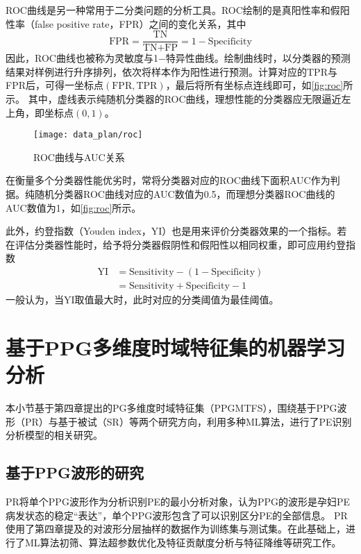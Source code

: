 ROC曲线是另一种常用于二分类问题的分析工具。ROC绘制的是真阳性率和假阳性率（false positive rate，FPR）之间的变化关系，其中
\begin{equation}
      \label{equ:fpr}
      \text{FPR}=\frac{\text{TN}}{\text{TN+FP}}=1-\text{Specificity}
\end{equation}
因此，ROC曲线也被称为灵敏度与1$-$特异性曲线。绘制曲线时，以分类器的预测结果对样例进行升序排列，依次将样本作为阳性进行预测。计算对应的TPR与FPR后，可得一坐标点$(\text{FPR},\text{TPR})$，最后将所有坐标点连线即可，如\autoref{fig:roc}所示。
其中，虚线表示纯随机分类器的ROC曲线，理想性能的分类器应无限逼近左上角，即坐标点$(0,1)$。
\begin{figure}[htbp]
      \centering
      \texttt{[image: data\_plan/roc]}
      \caption[ROC曲线与AUC关系]{\label{fig:roc}ROC曲线与AUC关系}
\end{figure}

在衡量多个分类器性能优劣时，常将分类器对应的ROC曲线下面积AUC作为判据。纯随机分类器ROC曲线对应的AUC数值为0.5，而理想分类器ROC曲线的AUC数值为1，如\autoref{fig:roc}所示。

此外，约登指数（Youden index，YI）也是用来评价分类器效果的一个指标。若在评估分类器性能时，给予将分类器假阴性和假阳性以相同权重，即可应用约登指数
\begin{equation}
      \label{equ:yi}
      \begin{aligned}
            \text{YI}&=\text{Sensitivity}-(1-\text{Specificity})\\
            &=\text{Sensitivity}+\text{Specificity}-1
      \end{aligned}
\end{equation}
一般认为，当YI取值最大时，此时对应的分类阈值为最佳阈值\cite{cwl}。

\section{基于PPG多维度时域特征集的机器学习分析}
本小节基于第四章提出的PG多维度时域特征集（PPGMTFS），围绕基于PPG波形（PR）与基于被试（SR）等两个研究方向，利用多种ML算法，进行了PE识别分析模型的相关研究。
\subsection{基于PPG波形的研究}
PR将单个PPG波形作为分析识别PE的最小分析对象，认为PPG的波形是孕妇PE病发状态的稳定“表达”，单个PPG波形包含了可以识别区分PE的全部信息。
PR使用了第四章提及的对波形分层抽样的数据作为训练集与测试集。在此基础上，进行了ML算法初筛、算法超参数优化及特征贡献度分析与特征降维等研究工作。

